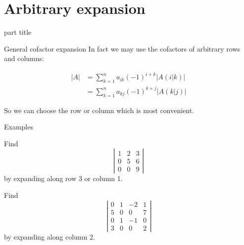\documentclass{beamer}
\begin{document}
\section{Arbitrary expansion}

\begin{frame}
  \begin{beamercolorbox}[sep=12pt,center]{part title}
    \insertsection\par
  \end{beamercolorbox}
\end{frame}

\begin{frame}{General cofactor expansion}
  In fact we may use the cofactors of arbitrary rows and columns:\vfill
  \begin{lemma}
    \begin{align*}
      \left|A\right| &= \sum_{k=1}^n a_{ik} (-1)^{i+k}\left|A(i| k)\right|\\
                     &= \sum_{k=1}^n a_{kj}(-1)^{k+j}\left|A(k| j)\right|
    \end{align*}
  \end{lemma}\vfill
  So we can choose the row or column which is most convenient.
\end{frame}


\begin{frame}{Examples}
  \begin{example}
    Find
    \begin{equation*}
      \left|
	\begin{array}{ccc}
          1&2&3\\
          0&5&6\\
          0&0&9
	\end{array}
      \right|
    \end{equation*}
    by expanding along row 3 or column 1.
  \end{example}\vfill
  \begin{example}
    Find
    \begin{equation*}
      \left|
	\begin{array}{cccc}
          0&1&-2&1\\
          5&0&0&7\\
          0&1&-1&0\\
          3&0&0&2
	\end{array}
      \right|
    \end{equation*}
    by expanding along column 2.
  \end{example}
\end{frame}
\end{document}

